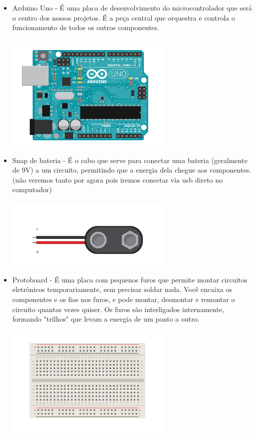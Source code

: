 \documentclass{report}
\begin{document}
	\begin{itemize}
		\item Arduino Uno - É uma placa de desenvolvimento do microcontrolador que será o centro dos nossos projetos. É a peça central que orquestra e controla o funcionamento de todos os outros componentes.  \\ \\
		\includegraphics[width=8cm]{imagens/arduino_desenho.png}
		
		\item Snap de bateria -  É o cabo que serve para conectar uma bateria (geralmente de 9V) a um circuito, permitindo que a energia dela chegue aos componentes. (não veremos tanto por agora pois iremos conectar via usb direto no computador)\\ \\
		\includegraphics[width=8cm]{imagens/snap_bateria.png}
		
		\item Protoboard - É uma placa com pequenos furos que permite montar circuitos eletrônicos temporariamente, sem precisar soldar nada. Você encaixa os componentes e os fios nos furos, e pode montar, desmontar e remontar o circuito quantas vezes quiser. Os furos são interligados internamente, formando "trilhos" que levam a energia de um ponto a outro. \\ \\
		\includegraphics[width=8cm]{imagens/protoboard.png}
		

\end{itemize}
\end{document}
